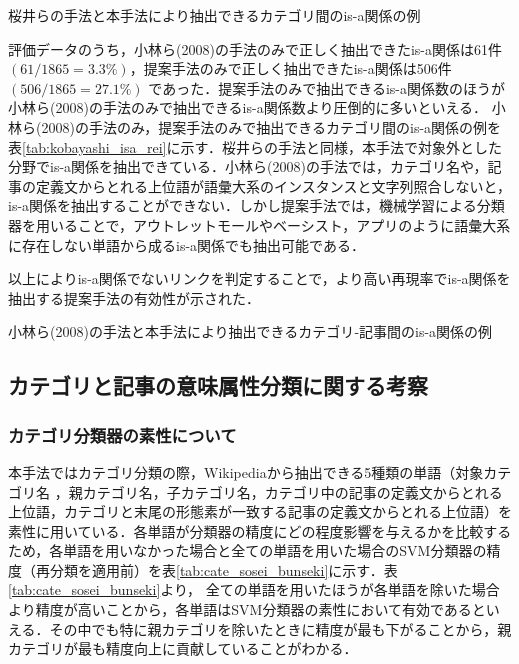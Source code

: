 \documentclass[japanese]{jnlp_1.4}
\begin{document}
\begin{table}[t]
\caption{桜井らの手法と本手法により抽出できるカテゴリ間のis-a関係の例}
\label{tab:sakurai_isa_rei}

\end{table}

評価データのうち，小林ら(2008)の手法のみで正しく抽出できたis-a関係は61件 $(61/1865=3.3\%)$，提案手法のみで正しく抽出できたis-a関係は506件 $(506/1865=27.1\%)$ であった．提案手法のみで抽出できるis-a関係数のほうが小林ら(2008)の手法のみで抽出できるis-a関係数より圧倒的に多いといえる．
小林ら(2008)の手法のみ，提案手法のみで抽出できるカテゴリ間のis-a関係の例を表\ref{tab:kobayashi_isa_rei}に示す．桜井らの手法と同様，本手法で対象外とした分野でis-a関係を抽出できている．小林ら(2008)の手法では，カテゴリ名や，記事の定義文からとれる上位語が語彙大系のインスタンスと文字列照合しないと，is-a関係を抽出することができない．しかし提案手法では，機械学習による分類器を用いることで，アウトレットモールやベーシスト，アプリのように語彙大系に存在しない単語から成るis-a関係でも抽出可能である．

以上によりis-a関係でないリンクを判定することで，より高い再現率でis-a関係を抽出する提案手法の有効性が示された．


\begin{table}[t]
\caption{小林ら(2008)の手法と本手法により抽出できるカテゴリ‐記事間のis-a関係の例}
\label{tab:kobayashi_isa_rei}

\end{table}
\begin{table}[t]
\label{tab:cate_sosei_bunseki}

\end{table}


\subsection{カテゴリと記事の意味属性分類に関する考察}

\subsubsection{カテゴリ分類器の素性について}

本手法ではカテゴリ分類の際，Wikipediaから抽出できる5種類の単語（対象カテゴリ名
，親カテゴリ名，子カテゴリ名，カテゴリ中の記事の定義文からとれる上位語，カテゴリと末尾の形態素が一致する記事の定義文からとれる上位語）を素性に用いている．各単語が分類器の精度にどの程度影響を与えるかを比較するため，各単語を用いなかった場合と全ての単語を用いた場合のSVM分類器の精度（再分類を適用前）を表\ref{tab:cate_sosei_bunseki}に示す．表\ref{tab:cate_sosei_bunseki}より，
全ての単語を用いたほうが各単語を除いた場合より精度が高いことから，各単語はSVM分類器の素性において有効であるといえる．その中でも特に親カテゴリを除いたときに精度が最も下がることから，親カテゴリが最も精度向上に貢献していることがわかる．
\end{document}
